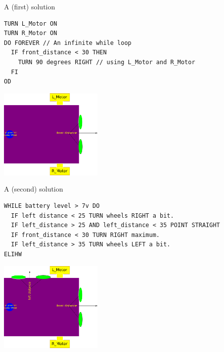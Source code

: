 \documentclass[color=pdftex,usenames,dvipsnames, aspectratio=169]{beamer}
\begin{document}
\begin{frame}[fragile=singleslide]{A (first) solution}
\begin{lstlisting}[linewidth=12cm,emph={THEN, DO,OD,IF,FI}]
TURN L_Motor ON
TURN R_Motor ON
DO FOREVER // An infinite while loop
  IF front_distance < 30 THEN
    TURN 90 degrees RIGHT // using L_Motor and R_Motor
  FI
OD
\end{lstlisting}

\vspace*{-1.7cm}\begin{center}\includegraphics[width=5cm]{Images/bitmap.png}\end{center}
\end{frame}

\begin{frame}[fragile=singleslide]{A (second) solution}
\begin{lstlisting}[linewidth=14cm,emph={DO,OD,IF,FI,WHILE,ELIHW}]
WHILE battery level > 7v DO
  IF left distance < 25 TURN wheels RIGHT a bit.
  IF left_distance > 25 AND left_distance < 35 POINT STRAIGHT
  IF front_distance < 30 TURN RIGHT maximum.
  IF left_distance > 35 TURN wheels LEFT a bit.
ELIHW
\end{lstlisting}

\vspace*{-1.25cm}\begin{center}\includegraphics[width=5cm]{Images/bitmapLeft.png}\end{center}
\end{frame}
\end{document}
